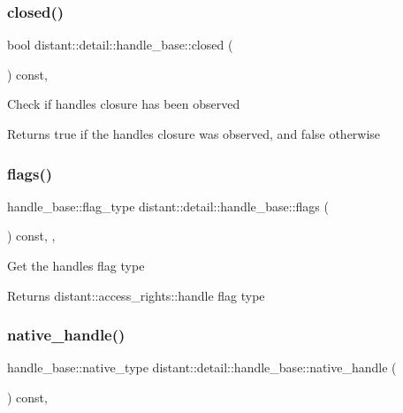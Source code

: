 \subsubsection{\texorpdfstring{closed()}{closed()}}
{\footnotesize\ttfamily bool distant\+::detail\+::handle\+\_\+base\+::closed (\begin{DoxyParamCaption}{ }\end{DoxyParamCaption}) const\hspace{0.3cm}{\ttfamily [inline]}, {\ttfamily [noexcept]}}

Check if handle\textquotesingle{}s closure has been observed \begin{DoxyReturn}{Returns}
true if the handle\textquotesingle{}s closure was observed, and false otherwise 
\end{DoxyReturn}
\mbox{\label{classdistant_1_1detail_1_1handle__base_adc97dc91543d76d0b89f43fee5f5f26b}} 
\subsubsection{\texorpdfstring{flags()}{flags()}}
{\footnotesize\ttfamily handle\+\_\+base\+::flag\+\_\+type distant\+::detail\+::handle\+\_\+base\+::flags (\begin{DoxyParamCaption}{ }\end{DoxyParamCaption}) const\hspace{0.3cm}{\ttfamily [inline]}, {\ttfamily [protected]}, {\ttfamily [noexcept]}}

Get the handle\textquotesingle{}s flag type \begin{DoxyReturn}{Returns}
distant\+::access\+\_\+rights\+::handle flag type 
\end{DoxyReturn}
\mbox{\label{classdistant_1_1detail_1_1handle__base_a3207e125c17f2ebb59cab614083f782b}} 
\subsubsection{\texorpdfstring{native\+\_\+handle()}{native\_handle()}}
{\footnotesize\ttfamily handle\+\_\+base\+::native\+\_\+type distant\+::detail\+::handle\+\_\+base\+::native\+\_\+handle (\begin{DoxyParamCaption}{ }\end{DoxyParamCaption}) const\hspace{0.3cm}{\ttfamily [inline]}, {\ttfamily [noexcept]}}

